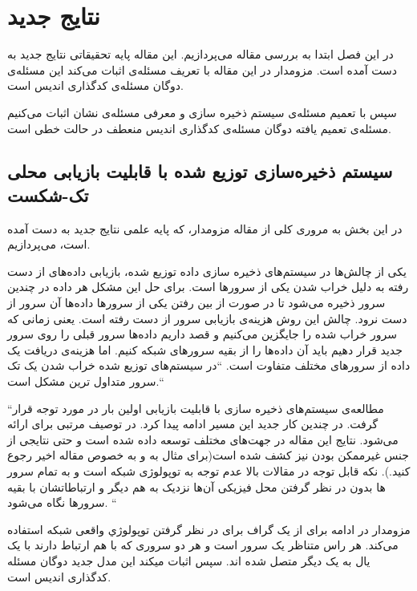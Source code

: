 \chapter{
نتایج جدید
}
\label{chapter:results}
در این فصل ابتدا به بررسی مقاله
\cite{arya}
 می‌پردازیم. این مقاله پایه تحقیقاتی نتایج جدید به دست آمده است. مزومدار در این مقاله با تعریف مسئله‌ی 
اثبات می‌کند این مسئله‌ی دوگان مسئله‌ی کدگذاری اندیس است.

سپس با تعمیم مسئله‌ی سیستم ذخیره سازی و معرفی مسئله‌ی
 نشان اثبات می‌کنیم مسئله‌ی تعمیم یافته دوگان مسئله‌ی کدگذاری اندیس منعطف در حالت خطی  است.
\newpage

\section{
 سیستم ذخیره‌سازی توزیع شده با قابلیت بازیابی محلی تک-شکست
}
در این بخش به مروری کلی از مقاله مزومدار، که پایه علمی نتایج جدید به دست آمده است، می‌پردازیم.

یکی از چالش‌ها در سیستم‌های ذخیره سازی داده توزیع شده، بازیابی داده‌های از دست رفته به دلیل خراب شدن یکی از سرورها است. 
برای حل این مشکل هر داده در چندین سرور ذخیره می‌شود تا در صورت از بین رفتن یکی از سرورها داده‌ها آن سرور از دست نرود. چالش این روش هزینه‌ی بازیابی سرور از دست رفته است. یعنی زمانی که سرور خراب شده را جایگزین می‌کنیم و قصد داریم داده‌ها سرور قبلی را روی سرور جدید قرار دهیم باید آن داده‌ها را از بقیه سرورهای شبکه 
کنیم. اما هزینه‌ی دریافت یک داده از سرورهای مختلف متفاوت است.
``در سیستم‌های توزیع شده خراب شدن یک تک سرور متداول ترین مشکل است.``

``مطالعه‌ی سیستم‌های ذخیره سازی با قابلیت بازیابی اولین بار در
\cite{5550492}
مورد توجه قرار گرفت. در چندین کار جدید این مسیر ادامه پیدا کرد. در
\cite{6259860}
توصیف مرتبی برای
ارائه می‌شود. نتایج این مقاله در جهت‌های مختلف توسعه داده شده است و حتی نتایجی از جنس غیرممکن بودن نیز کشف شده است(برای مثال به
\cite{
	6570829, kamath2013codes,6818438,silberstein2013optimal, tamo2013optimal}
و به خصوص مقاله اخیر 
\cite{Tamo_2014}
رجوع کنید.). نکه قابل توجه در مقالات بالا عدم توجه به توپولوژی شبکه است و به تمام سرور ها بدون در نظر گرفتن محل فیزیکی آن‌ها نزدیک به هم دیگر و ارتباطاتشان با بقیه سرورها نگاه می‌شود.
 ``
 
 مزومدار در ادامه برای از یک گراف برای در نظر گرفتن توپولوژي واقعی شبکه استفاده می‌کند. هر راس متناظر یک سرور است و هر دو سروری که با هم ارتباط دارند با یک یال به یک دیگر متصل شده اند. سپس اثبات میکند این مدل جدید دوگان مسئله کدگذاری اندیس است.
 
